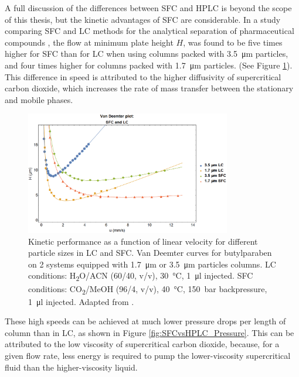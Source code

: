 A full discussion of the differences between SFC and HPLC is beyond the scope of
this thesis, but the kinetic advantages of SFC are considerable. In a study
comparing SFC and LC methods for the analytical separation of pharmaceutical
compounds \autocite{Perrenoud2012}, the flow at minimum plate height \(H\), was
found to be five times higher for SFC than for LC when using columns packed with
\SI{3.5}{\micro\metre} particles, and four times higher for columns packed with
\SI{1.7}{\micro\metre} particles. (See Figure \ref{fig:SFCvsHPLC_Van_Deemter}).
This difference in speed is attributed to the higher diffusivity of
supercritical carbon dioxide, which increases the rate of mass transfer between
the stationary and mobile phases.

\begin{figure}[hptb] \centering
\includegraphics[width=0.8\textwidth]{Figures/SFCvsHPLC_Van_Deemter} \decoRule
\caption[Van Deemter]{Kinetic performance as a function of linear velocity for
different particle sizes in LC and SFC. Van Deemter curves for butylparaben on 2
systems equipped with \SI{1.7}{\micro\metre} or \SI{3.5}{\micro\metre} particles
columns. LC conditions: H\textsubscript{2}O/ACN (60/40, v/v), \SI{30}{\celsius},
\SI{1}{\micro\litre} injected. SFC conditions: CO\textsubscript{2}/MeOH (96/4,
v/v), \SI{40}{\celsius}, \SI{150}{\bar} backpressure, \SI{1}{\micro\litre}
injected. Adapted from \autocite{Perrenoud2012}.}
\label{fig:SFCvsHPLC_Van_Deemter}

\end{figure}

These high speeds can be achieved at much lower pressure drops per length of
column than in LC, as shown in Figure \ref{fig:SFCvsHPLC_Pressure}. This can be
attributed to the low viscosity of supercritical carbon dioxide, because, for a
given flow rate, less energy is required to pump the lower-viscosity
supercritical fluid than the higher-viscosity liquid.

